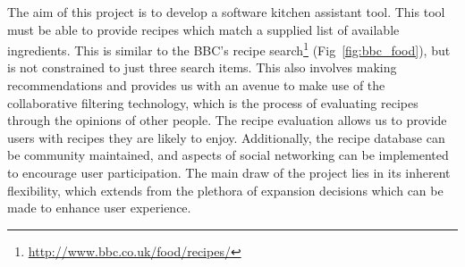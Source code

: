 The aim of this project is to develop a software kitchen assistant tool. This tool must be able to provide recipes which match a supplied list of available ingredients. This is similar to the BBC's recipe search\footnote{\url{http://www.bbc.co.uk/food/recipes/}} (Fig~\ref{fig:bbc_food}), but is not constrained to just three search items. This also involves making recommendations and provides us with an avenue to make use of the collaborative filtering technology, which is the process of evaluating recipes through the opinions of
other people. The recipe evaluation allows us to provide users with recipes they are likely to enjoy. Additionally, the recipe database can be community maintained, and aspects of social networking can be implemented to encourage user participation. The main draw of the project lies in its inherent flexibility, which extends from the plethora of expansion decisions which can be made to enhance user experience.
